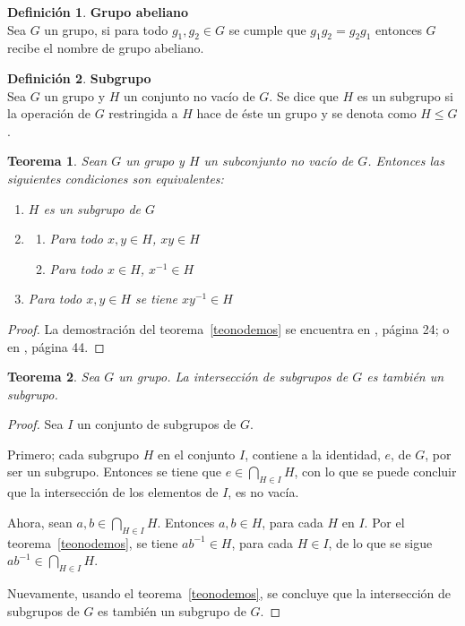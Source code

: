 \documentclass[12pt]{book}
\newtheorem{theorem}{Teorema}
\theoremstyle{definition}
\newtheorem{definition}{Definición}
\begin{document}
\begin{definition}\textbf{Grupo abeliano}\\
  Sea $G$ un grupo, si para todo $g_1,g_2\in G$ se cumple que
  $g_1g_2=g_2g_1$ entonces $G$ recibe el nombre de grupo abeliano.
\end{definition}


\begin{definition}\textbf{Subgrupo}\\
  Sea $G$ un grupo y $H$ un conjunto no vacío de $G$. Se dice que $H$
  es un subgrupo si la operación de $G$ restringida a $H$ hace de
  \'este un grupo y se denota como $H\le G$.
\end{definition}


\begin{theorem}\label{subgrupo}
  Sean $G$ un grupo y $H$ un subconjunto no vacío de $G$. Entonces las
  siguientes condiciones son equivalentes:
  \begin{enumerate}
  \item $H$ es un subgrupo de $G$
  \item \begin{enumerate}
    \item Para todo $x,y \in H$, $xy\in H$
    \item Para todo $x\in H$, $x^{-1}\in H$
    \end{enumerate}
  \item Para todo $x,y \in H$ se tiene $xy^{-1}\in H$
  \end{enumerate}\label{teonodemos}
\end{theorem}

\begin{proof}
  La demostración del teorema~\ref{teonodemos} se encuentra en
  \cite{Barrera}, página 24; o en \cite{Ehrlich}, página 44.
\end{proof}

\begin{theorem}
Sea $G$ un grupo. La intersección de subgrupos de $G$ es también un subgrupo. 
\end{theorem}

\begin{proof}
Sea $I$ un conjunto de subgrupos de $G$. 

Primero; cada subgrupo $H$ en el conjunto $I$, contiene a la identidad,
$e$, de $G$, por ser un subgrupo. Entonces se tiene que
$e\in \bigcap_{H\in I}H$, con lo que se puede concluir que la
intersección de los elementos de $I$, es no vacía.

Ahora, sean $a,b\in \bigcap_{H\in I}H$. Entonces $a,b\in H$,
para cada $H$ en $I$. Por el teorema~\ref{teonodemos}, se tiene
$ab^{-1}\in H$, para cada $H\in I$, de lo que se sigue $ab^{-1}\in
\bigcap_{H\in I}H$.

Nuevamente, usando el teorema~\ref{teonodemos}, se concluye que la
intersección de subgrupos de $G$ es también un subgrupo de $G$.
\end{proof}
\end{document}
